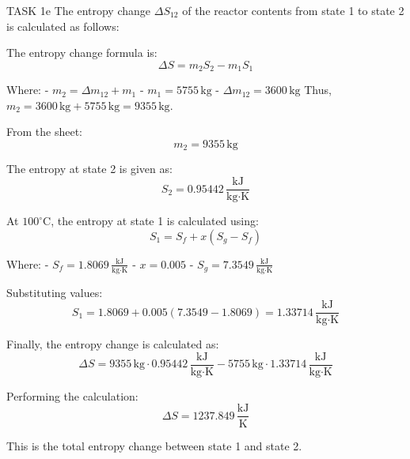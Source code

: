 TASK 1e  
The entropy change \( \Delta S_{12} \) of the reactor contents from state 1 to state 2 is calculated as follows:

The entropy change formula is:  
\[
\Delta S = m_2 S_2 - m_1 S_1
\]

Where:  
- \( m_2 = \Delta m_{12} + m_1 \)  
- \( m_1 = 5755 \, \text{kg} \)  
- \( \Delta m_{12} = 3600 \, \text{kg} \)  
Thus, \( m_2 = 3600 \, \text{kg} + 5755 \, \text{kg} = 9355 \, \text{kg} \).

From the sheet:  
\[
m_2 = 9355 \, \text{kg}
\]

The entropy at state 2 is given as:  
\[
S_2 = 0.95442 \, \frac{\text{kJ}}{\text{kg·K}}
\]

At \( 100^\circ\text{C} \), the entropy at state 1 is calculated using:  
\[
S_1 = S_f + x (S_g - S_f)
\]

Where:  
- \( S_f = 1.8069 \, \frac{\text{kJ}}{\text{kg·K}} \)  
- \( x = 0.005 \)  
- \( S_g = 7.3549 \, \frac{\text{kJ}}{\text{kg·K}} \)  

Substituting values:  
\[
S_1 = 1.8069 + 0.005 (7.3549 - 1.8069) = 1.33714 \, \frac{\text{kJ}}{\text{kg·K}}
\]

Finally, the entropy change is calculated as:  
\[
\Delta S = 9355 \, \text{kg} \cdot 0.95442 \, \frac{\text{kJ}}{\text{kg·K}} - 5755 \, \text{kg} \cdot 1.33714 \, \frac{\text{kJ}}{\text{kg·K}}
\]

Performing the calculation:  
\[
\Delta S = 1237.849 \, \frac{\text{kJ}}{\text{K}}
\]  

This is the total entropy change between state 1 and state 2.